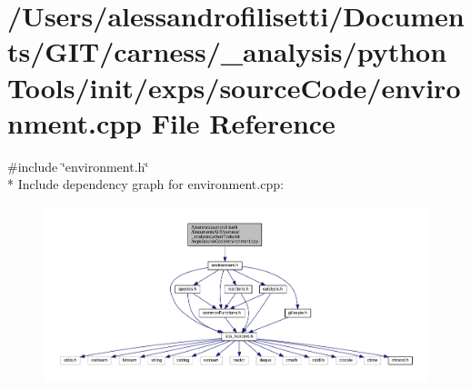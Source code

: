 \hypertarget{a00060}{\section{/\+Users/alessandrofilisetti/\+Documents/\+G\+I\+T/carness/\+\_\+analysis/python\+Tools/init/exps/source\+Code/environment.cpp File Reference}
\label{a00060}
}
{\ttfamily \#include \char`\"{}environment.\+h\char`\"{}}\\*
Include dependency graph for environment.\+cpp\+:\nopagebreak
\begin{figure}[H]
\begin{center}
\leavevmode
\includegraphics[width=350pt]{a00178}
\end{center}
\end{figure}
